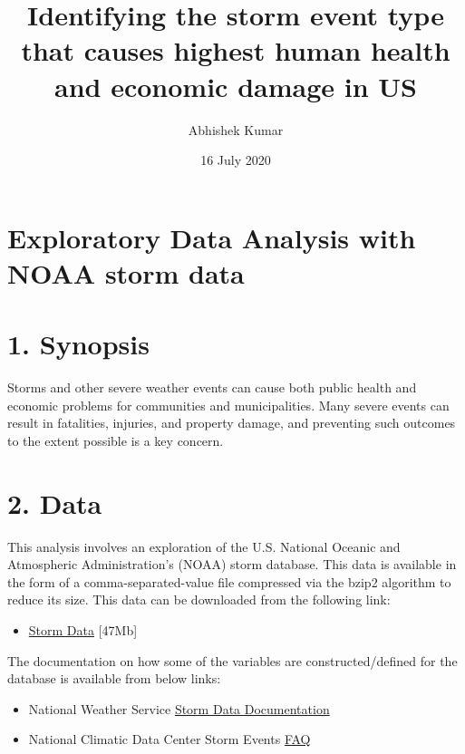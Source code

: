 \documentclass[]{article}
\title{Identifying the storm event type that causes highest human health and
economic damage in US}
\author{Abhishek Kumar}
\date{16 July 2020}
\providecommand{\tightlist}{%
  \setlength{\itemsep}{0pt}\setlength{\parskip}{0pt}}
\begin{document}
\maketitle

\section{Exploratory Data Analysis with NOAA storm
data}\label{exploratory-data-analysis-with-noaa-storm-data}

\section{1. Synopsis}\label{synopsis}

Storms and other severe weather events can cause both public health and
economic problems for communities and municipalities. Many severe events
can result in fatalities, injuries, and property damage, and preventing
such outcomes to the extent possible is a key concern.

\section{2. Data}\label{data}

This analysis involves an exploration of the U.S. National Oceanic and
Atmospheric Administration's (NOAA) storm database. This data is
available in the form of a comma-separated-value file compressed via the
bzip2 algorithm to reduce its size. This data can be downloaded from the
following link:

\begin{itemize}
\tightlist
\item
  \href{https://d396qusza40orc.cloudfront.net/repdata\%2Fdata\%2FStormData.csv.bz2}{Storm
  Data} {[}47Mb{]}
\end{itemize}

The documentation on how some of the variables are constructed/defined
for the database is available from below links:

\begin{itemize}
\item
  National Weather Service
  \href{https://d396qusza40orc.cloudfront.net/repdata\%2Fpeer2_doc\%2Fpd01016005curr.pdf}{Storm
  Data Documentation}
\item
  National Climatic Data Center Storm Events
  \href{https://d396qusza40orc.cloudfront.net/repdata\%2Fpeer2_doc\%2FNCDC\%20Storm\%20Events-FAQ\%20Page.pdf}{FAQ}
\end{itemize}
\end{document}
